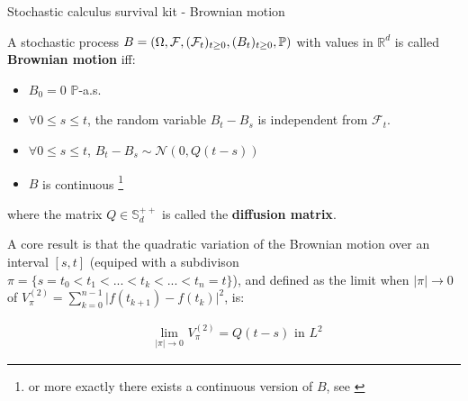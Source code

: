 \begin{frame}{Stochastic calculus survival kit - Brownian motion}
\begin{definition}
A stochastic process $B = (\Omega, \mathcal{F}, (\mathcal{F}_t)_{t \geq 0}, (B_t)_{t \geq 0}, \mathbb{P})$ with values in $\mathbb{R}^d$ is called \textbf{Brownian motion} iff:
\begin{itemize}
    \item $B_0 = 0$ $\mathbb{P}$-a.s.
    \item $\forall 0 \leq s \leq t$, the random variable $B_t-B_s$ is independent from $\mathcal{F}_t$.
    \item $\forall 0 \leq s \leq t$, $B_t - B_s \sim \mathcal{N}(0,Q(t-s))$
    \item $B$ is continuous \footnote{or more exactly there exists a continuous version of $B$, see \cite{mouvement-brownien-calcul-ito}}
\end{itemize}
where the matrix $Q \in \mathbb{S}^{++}_d$ is called the \textbf{diffusion matrix}.
\end{definition}


A core result is that the quadratic variation of the Brownian motion over an interval $[s,t]$ (equiped
with a subdivison $\pi = \{s=t_0 < t_1 < ...< t_k <... < t_n=t\}$), and defined as the limit when $\vert \pi \vert \rightarrow 0$ 
of $V_{\pi}^{(2)} = \sum_{k=0}^{n-1} \vert f(t_{k+1})-f(t_k)\vert^{2}$, is:

\begin{align}
    &\underset{\vert \pi \vert \rightarrow 0}{\text{lim}}\,\, V_{\pi}^{(2)} = Q(t-s) \,\, \text{in} \,\, L^{2}
\end{align}

\end{frame}


